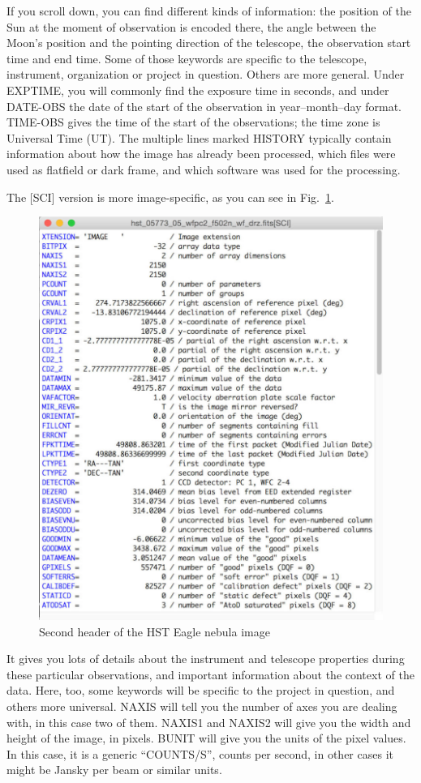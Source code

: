 \documentclass[twocolumn,apj]{openjournal}
\begin{document}
If you scroll down, you can find different kinds of information: the position of the Sun at the moment of observation is encoded there, the angle between the Moon's position and the pointing direction of the telescope, the observation start time and end time. Some of those keywords are specific to the telescope, instrument, organization or project in question. Others are more general. Under EXPTIME, you will commonly find the exposure time in seconds, and under DATE-OBS the date of the start of the observation in year--month--day format. TIME-OBS gives the time of the start of the observations; the time zone is Universal Time (UT). The multiple lines marked HISTORY typically contain information about how the image has already been processed, which files were used as flatfield or dark frame, and which software was used for the processing.

The [SCI] version is more image-specific, as you can see in Fig.~\ref{EagleHeader2}.
\begin{figure}[htbp]
\begin{center}
\includegraphics[width=\linewidth]{header2.jpg}
\caption{Second header of the HST Eagle nebula image}
\label{EagleHeader2}
\end{center}
\end{figure}
It gives you lots of details about the instrument and telescope properties during these particular observations, and important information about the context of the data. Here, too, some keywords will be specific to the project in question, and others more universal. NAXIS will tell you the number of axes you are dealing with, in this case two of them. NAXIS1 and NAXIS2 will give you the width and height of the image, in pixels. BUNIT will give you the units of the pixel values. In this case, it is a generic ``COUNTS/S'', counts per second, in other cases it might be Jansky per beam or similar units.
\end{document}
